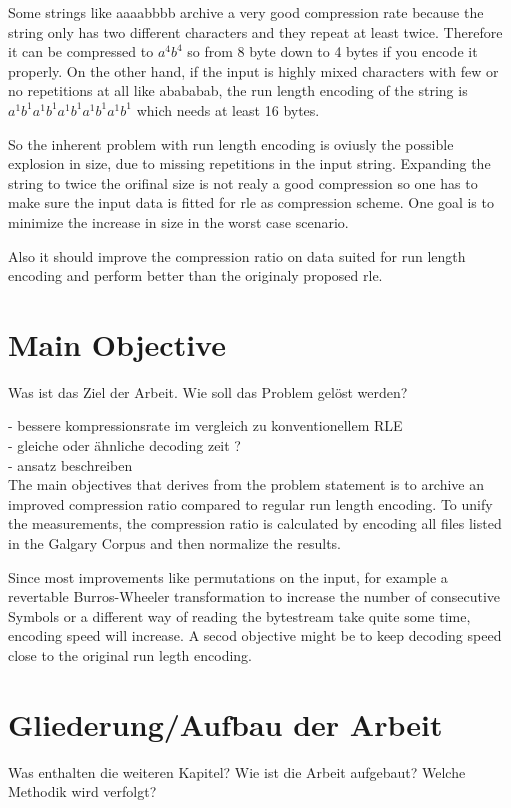 Some strings like aaaabbbb archive a very good compression rate because the string only has two different characters and they repeat at least twice. Therefore it can be compressed to $a^4b^4$ so from 8 byte down to 4 bytes if you encode it properly. On the other hand, if the input is highly mixed characters with few or no repetitions at all like abababab, the run length encoding of the string is $a^1b^1a^1b^1a^1b^1a^1b^1a^1b^1$ which needs at least 16 bytes. \par
So the inherent problem with run length encoding is oviusly the possible explosion in size, due to missing repetitions in the input string. Expanding the string to twice the orifinal size is not realy a good compression so one has to make sure the input data is fitted for rle as compression scheme. One goal is to minimize the increase in size in the worst case scenario. \par
Also it should improve the compression ratio on data suited for run length encoding and perform better than the originaly proposed rle.

\section{Main Objective}
\label{ch:Introduction:sec:Main Objective}

Was ist das Ziel der Arbeit. Wie soll das Problem gelöst werden?

- bessere kompressionsrate im vergleich zu konventionellem RLE\\
- gleiche oder ähnliche decoding zeit ?\\
- ansatz beschreiben\\

The main objectives that derives from the problem statement is to archive an improved compression ratio compared to regular run length encoding. To unify the measurements, the compression ratio is calculated by encoding all files listed in the Galgary Corpus and then normalize the results. \par
Since most improvements like permutations on the input, for example a revertable Burros-Wheeler transformation to increase the number of consecutive Symbols or a different way of reading the bytestream take quite some time, encoding speed will increase. A secod objective might be to keep decoding speed close to the original run legth encoding.

\section{Gliederung/Aufbau der Arbeit}
\label{ch:Intoduction:sec:Gliederung}

Was enthalten die weiteren Kapitel? Wie ist die Arbeit aufgebaut? Welche Methodik wird verfolgt?



